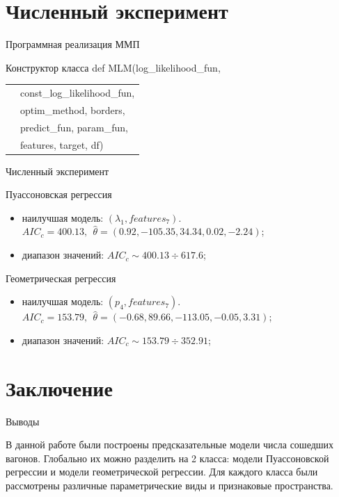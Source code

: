 \documentclass[aspectratio=169]{beamer}
\begin{document}
    \section{Численный эксперимент}
    \begin{frame}{Программная реализация ММП}
        \begin{block}{Конструктор класса}
            \textcolor{myGreen}{def} \textcolor{myBlue}{MLM}(log\_likelihood\_fun,\\
            \begin{tabular}{p{1cm}l}
                & const\_log\_likelihood\_fun,\\
                & optim\_method, borders,\\
                & predict\_fun, param\_fun,\\
                & features, target, df)
            \end{tabular}
        \end{block}
    \end{frame}
    
    
    \begin{frame}{Численный эксперимент}
        \begin{block}{Пуассоновская регрессия}
            \begin{itemize}
                \item наилучшая модель: $(\lambda_1, features_7)$. $AIC_c = 400.13,~~\hat\theta=(0.92, -105.35, 34.34, 0.02, -2.24)$;
                \item диапазон значений: $AIC_c \sim 400.13 \div 617.6$;
            \end{itemize}
        \end{block}
    
        \begin{block}{Геометрическая регрессия}
            \begin{itemize}
                \item наилучшая модель: $(p_4, features_7)$. $AIC_c = 153.79,~~\hat\theta=(-0.68, 89.66, -113.05, -0.05, 3.31)$;
                \item диапазон значений: $AIC_c \sim 153.79 \div 352.91$;
            \end{itemize}
        \end{block}
    \end{frame}


    \section{Заключение}
    \begin{frame}{Выводы}
        \begin{block}{}
            В данной работе были построены предсказательные модели числа сошедших вагонов. Глобально их можно разделить на 2 класса: модели Пуассоновской регрессии и модели геометрической регрессии. Для каждого класса были рассмотрены различные параметрические виды и признаковые пространства.
        \end{block}
    \end{frame}
\end{document}
